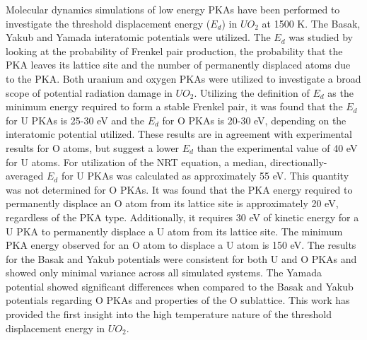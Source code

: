 \documentclass[8pt]{article}   	%
\begin{document}
Molecular dynamics simulations of low energy PKAs have been performed to investigate the threshold displacement energy ($E_d$) in $UO_2$ at 1500 K. The Basak, Yakub and Yamada interatomic potentials were utilized. The $E_d$ was studied by looking at the probability of Frenkel pair production, the probability that the PKA leaves its lattice site and the number of permanently displaced atoms due to the PKA. Both uranium and oxygen PKAs were utilized to investigate a broad scope of potential radiation damage in $UO_2$. Utilizing the definition of $E_d$ as the minimum energy required to form a stable Frenkel pair, it was found that the $E_d$ for U PKAs is 25-30 eV and the $E_d$ for O PKAs is 20-30 eV, depending on the interatomic potential utilized. These results are in agreement with experimental results for O atoms, but suggest a lower $E_d$ than the experimental value of 40 eV for U atoms. For utilization of the NRT equation, a median, directionally-averaged $E_d$ for U PKAs was calculated as approximately 55 eV. This quantity was not determined for O PKAs. It was found that the PKA energy required to permanently displace an O atom from its lattice site is approximately 20 eV, regardless of the PKA type. Additionally, it requires 30 eV of kinetic energy for a U PKA to permanently displace a U atom from its lattice site. The minimum PKA energy observed for an O atom to displace a U atom is 150 eV. The results for the Basak and Yakub potentials were consistent for both U and O PKAs and showed only minimal variance across all simulated systems. The Yamada potential showed significant differences when compared to the Basak and Yakub potentials regarding O PKAs and properties of the O sublattice. This work has provided the first insight into the high temperature nature of the threshold displacement energy in $UO_2$.




\end{document}
